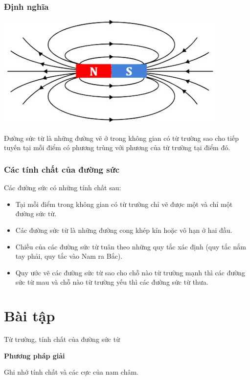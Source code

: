 \subsubsection{Định nghĩa}

\begin{center}
	\includegraphics[scale=0.8]{../figs/VN11-PH-24-L-016-1-h104.jpg}
\end{center}
Đường sức từ là những đường vẽ ở trong không gian có từ trường sao cho tiếp tuyến tại mỗi điểm có phương trùng với phương của từ trường tại điểm đó.  
\subsubsection{Các tính chất của đường sức}
Các đường sức có những tính chất sau:

	\begin{itemize}
	\item Tại mỗi điểm trong không gian có từ trường chỉ vẽ được một và chỉ một đường sức từ.
	\item Các đường sức từ là những đường cong khép kín hoặc vô hạn ở hai đầu.
	\item Chiều của các đường sức từ tuân theo những quy tắc xác định (quy tắc nắm tay phải, quy tắc vào Nam ra Bắc).
	\item 	Quy ước vẽ các đường sức từ sao cho chỗ nào từ trường mạnh thì các đường sức từ mau và chỗ nào từ trường yếu thì các đường sức từ thưa.
\end{itemize}

\section{Bài tập}
\begin{dang}{Từ trường, tính chất của đường sức từ}
\end{dang}

\textbf{Phương pháp giải}

Ghi nhớ tính chất và các cực của nam châm.

